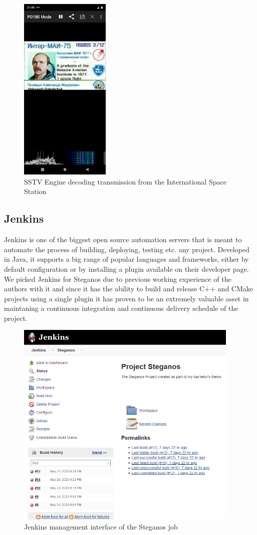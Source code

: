 \begin{figure}[H]
    \centering
    \includegraphics[height=9cm,keepaspectratio]{pics/application_chapter/sstv_example_iss}
    \caption{SSTV Engine decoding transmission from the International Space Station}
\end{figure}

\subsection{Jenkins}
Jenkins is one of the biggest open source automation servers that is meant to automate the process of building, deploying, testing etc. any project. Developed in Java, it supports a big range of popular languages and frameworks, either by default configuration or by installing a plugin available on their developer page. We picked Jenkins for Steganos due to previous working experience of the authors with it and since it has the ability to build and release C++ and CMake projects using a single plugin it has proven to be an extremely valuable asset in maintaning a continuous integration and continuous delivery schedule of the project.

\begin{figure}[H]
    \centering
    \includegraphics[height=10cm,keepaspectratio]{pics/application_chapter/steganos_jenkins_job}
    \caption{Jenkins management interface of the Steganos job}
\end{figure}


